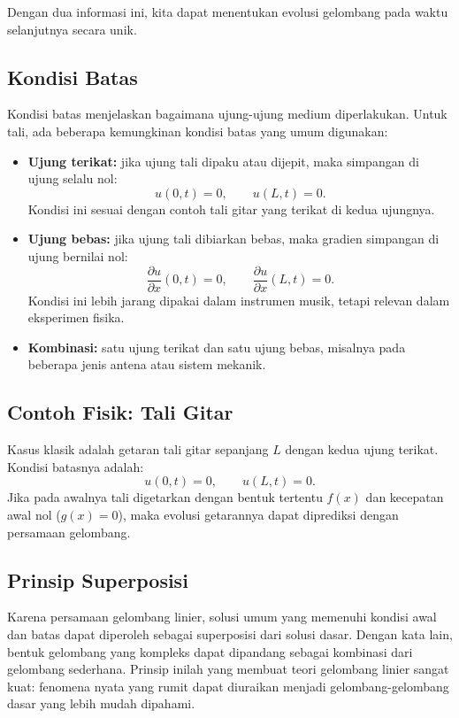 \documentclass{bukumjh}
\begin{document}
Dengan dua informasi ini, kita dapat menentukan evolusi gelombang pada waktu selanjutnya secara unik.

\subsection*{Kondisi Batas}
Kondisi batas menjelaskan bagaimana ujung-ujung medium diperlakukan. 
Untuk tali, ada beberapa kemungkinan kondisi batas yang umum digunakan:
\begin{itemize}
  \item \textbf{Ujung terikat:} jika ujung tali dipaku atau dijepit, maka simpangan di ujung selalu nol:
  \[
  u(0,t) = 0, \qquad u(L,t) = 0.
  \]
  Kondisi ini sesuai dengan contoh tali gitar yang terikat di kedua ujungnya.
  \item \textbf{Ujung bebas:} jika ujung tali dibiarkan bebas, maka gradien simpangan di ujung bernilai nol:
  \[
  \frac{\partial u}{\partial x}(0,t) = 0, \qquad \frac{\partial u}{\partial x}(L,t) = 0.
  \]
  Kondisi ini lebih jarang dipakai dalam instrumen musik, tetapi relevan dalam eksperimen fisika.
  \item \textbf{Kombinasi:} satu ujung terikat dan satu ujung bebas, misalnya pada beberapa jenis antena atau sistem mekanik.
\end{itemize}

\subsection*{Contoh Fisik: Tali Gitar}
Kasus klasik adalah getaran tali gitar sepanjang $L$ dengan kedua ujung terikat. 
Kondisi batasnya adalah:
\[
u(0,t) = 0, \qquad u(L,t) = 0.
\]
Jika pada awalnya tali digetarkan dengan bentuk tertentu $f(x)$ dan kecepatan awal nol ($g(x)=0$), maka evolusi getarannya dapat diprediksi dengan persamaan gelombang.

\subsection*{Prinsip Superposisi}
Karena persamaan gelombang linier, solusi umum yang memenuhi kondisi awal dan batas dapat diperoleh sebagai superposisi dari solusi dasar. 
Dengan kata lain, bentuk gelombang yang kompleks dapat dipandang sebagai kombinasi dari gelombang sederhana. 
Prinsip inilah yang membuat teori gelombang linier sangat kuat: fenomena nyata yang rumit dapat diuraikan menjadi gelombang-gelombang dasar yang lebih mudah dipahami.
\end{document}
